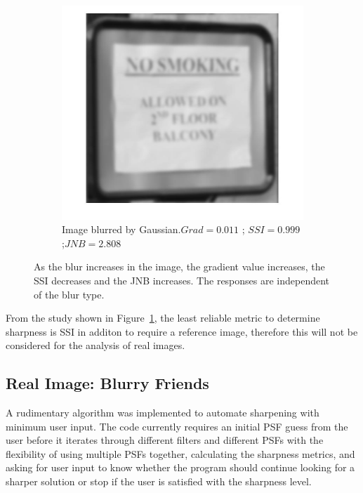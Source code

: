 \begin{figure}[H]
\begin{subfigure}[b]{0.3\textwidth}
        \end{subfigure}
        \hspace{.6cm}
        \begin{subfigure}[b]{0.3\textwidth}
                \centering
                \includegraphics[width=\textwidth]{sign_G.jpg}
                \caption{\fontsize{10}{1} \selectfont Image blurred by Gaussian.\newline $Grad=0.011$ ; $SSI=0.999$ ;\newline $JNB=2.808$} 
        \end{subfigure} 
       
        \caption{\fontsize{10}{1} \selectfont As the blur increases in the image, the gradient value increases, the SSI decreases and the JNB increases. The responses are independent of the blur type.} \label{fig:train_metrics}
\end{figure}

\noindent From the study shown in Figure~\ref{fig:train_metrics}, the least reliable metric to determine sharpness is SSI in additon to require a reference image, therefore this will not be considered for the analysis of real images.

\subsection{Real Image: Blurry Friends}
A rudimentary algorithm was implemented to automate sharpening with minimum user input. The code currently requires an initial PSF guess from the user before it  iterates through different filters and different PSFs with the flexibility of using multiple PSFs together, calculating the sharpness metrics, and asking for user input to know whether the program should continue looking for a sharper solution or stop if the user is satisfied with the sharpness level. \\


